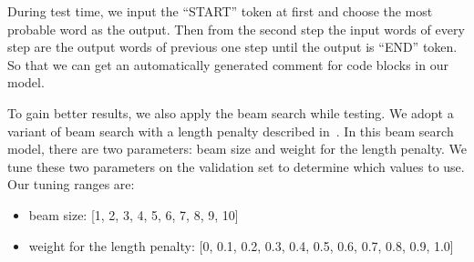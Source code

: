 During test time, we input the ``START'' token at first and choose the 
most probable word as the output. Then from the second step the input words of every step are the output words of previous one step until the output is ``END'' token. So that we can get an automatically generated comment for code blocks 
in our model.

To gain better results, we also apply the beam search while testing.
We adopt a variant of beam search with a length penalty described
in~\cite{wu2016google}. In this beam search model, there are two parameters:
beam size and weight for the length penalty. We tune these
two parameters on the validation set to determine which values to use.
Our tuning ranges are:
\begin{itemize}
    \item beam size: [1, 2, 3, 4, 5, 6, 7, 8, 9, 10]
    \item weight for the length penalty: [0, 0.1, 0.2, 0.3, 0.4, 0.5, 0.6, 0.7, 0.8, 0.9, 1.0]
\end{itemize}

